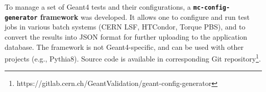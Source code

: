 
To manage a set of Geant4 tests and their configurations, a \textbf{{\tt mc-config-generator} framework} was developed. It allows one to configure and run test jobs in various batch systems (CERN LSF, HTCondor, Torque PBS), and to convert the results into  JSON format for further uploading to the application database. The framework is not Geant4-specific, and can be used with other projects (e.g., Pythia8). Source code is available in corresponding Git repository\footnote{https://gitlab.cern.ch/GeantValidation/geant-config-generator}.


